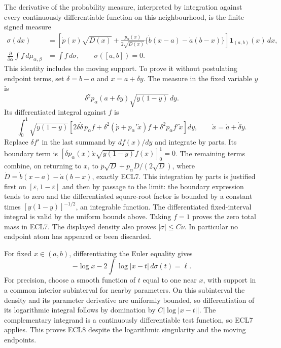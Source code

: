 \documentclass[11pt,a4paper]{article}
\begin{document}
The derivative of the probability measure, interpreted by integration
against every continuously differentiable function on this neighbourhood,
is the finite signed measure
\begin{equation}\tag{ECL7}
\begin{split}
\sigma(dx)&=\left[
\dot p(x)\sqrt{D(x)}
+\frac{p_\alpha(x)}{2\sqrt{D(x)}}
 \{\dot b(x-a)-\dot a(b-x)\}\right]\mathbf1_{(a,b)}(x)\,dx,\\
\frac{\partial}{\partial\alpha}\int f\,d\mu_{\alpha,\beta}
&=\int f\,d\sigma,\qquad \sigma([a,b])=0.
\end{split}
\end{equation}
This identity includes the moving support. To prove it without
postulating endpoint terms, set $\delta=b-a$ and $x=a+\delta y$.
The measure in the fixed variable $y$ is
\[
\delta^2 p_\alpha(a+\delta y)\sqrt{y(1-y)}\,dy.
\]
Its differentiated integral against $f$ is
\[
\int_0^1\sqrt{y(1-y)}
\left[
2\delta\dot\delta\,p_\alpha f
+\delta^2(\dot p+p_\alpha'\dot x)f
+\delta^2p_\alpha f'\dot x
\right]dy,\qquad \dot x=\dot a+\dot\delta y.
\]
Replace $\delta f'$ in the last summand by $d f(x)/dy$ and
integrate by parts. Its boundary term is
$[\delta p_\alpha(x)\dot x\sqrt{y(1-y)}f(x)]_0^1=0$.
The remaining terms combine, on returning to $x$, to
$\dot p\sqrt D+p_\alpha\dot D/(2\sqrt D)$, where
$\dot D=\dot b(x-a)-\dot a(b-x)$, exactly ECL7.
This integration by parts is justified first on
$[\varepsilon,1-\varepsilon]$ and then by passage to the limit:
the boundary expression tends to zero and the differentiated
square-root factor is bounded by a constant times
$[y(1-y)]^{-1/2}$, an integrable function. The differentiated
fixed-interval integral is valid by the uniform bounds above.
Taking $f=1$ proves the zero total mass in ECL7.
The displayed density also proves $|\sigma|\leq C\nu$.
In particular no endpoint atom has appeared or been discarded.

For fixed $x\in(a,b)$, differentiating the Euler equality gives
\begin{equation}\tag{ECL8}
-\log x-2\int\log|x-t|\,d\sigma(t)=\dot\ell.
\end{equation}
For precision, choose a smooth function of $t$ equal to one near
$x$, with support in a common interior subinterval for nearby
parameters. On this subinterval the density and its parameter
derivative are uniformly bounded, so differentiation of its
logarithmic integral follows by domination by
$C|\log|x-t||$. The complementary integrand is a continuously
differentiable test function, so ECL7 applies. This proves ECL8
despite the logarithmic singularity and the moving endpoints.
\end{document}
